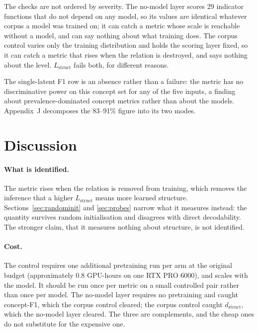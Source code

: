 \documentclass{article} %
\newcommand{\Lstruct}{\ensuremath{L_{\mathrm{struct}}}}
\newcommand{\dstruct}{\ensuremath{d_{\mathrm{struct}}}}
\begin{document}
The checks are not ordered by severity. The no-model layer scores 29 indicator functions that do
not depend on any model, so its values are identical whatever corpus a model was trained on; it can
catch a metric whose scale is reachable without a model, and can say nothing about what training
does. The corpus control varies only the training distribution and holds the scoring layer fixed,
so it can catch a metric that rises when the relation is destroyed, and says nothing about the
level. \Lstruct{} fails both, for different reasons.

The single-latent F1 row is an absence rather than a failure: the metric has no discriminative
power on this concept set for any of the five inputs, a finding about prevalence-dominated concept
metrics rather than about the models. Appendix~J decomposes the 83--91\% figure into its two modes.

\section{Discussion}
\label{sec:discussion}

\paragraph{What is identified.} The metric rises when the relation is removed from training, which
removes the inference that a higher \Lstruct{} means more learned structure.
Sections~\ref{sec:randominit} and \ref{sec:probes} narrow what it measures instead: the quantity
survives random initialisation and disagrees with direct decodability. The stronger claim, that it
measures nothing about structure, is not identified.

\paragraph{Cost.} The control requires one additional pretraining run per arm at the original
budget (approximately 0.8 GPU-hours on one RTX PRO 6000), and scales with the model. It should be
run once per metric on a small controlled pair rather than once per model. The no-model layer
requires no pretraining and caught concept-F1, which the corpus control cleared; the corpus control
caught \dstruct, which the no-model layer cleared. The three are complements, and the cheap ones do
not substitute for the expensive one.
\end{document}
